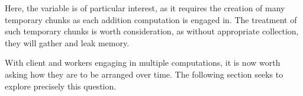 
Here, the variable  is of particular interest, as it requires the creation of many temporary chunks as each addition computation is engaged in.
The treatment of such temporary chunks is worth consideration, as without appropriate collection, they will gather and leak memory.

With client and workers engaging in multiple computations, it is now worth asking how they are to be arranged over time.
The following section seeks to explore precisely this question.
